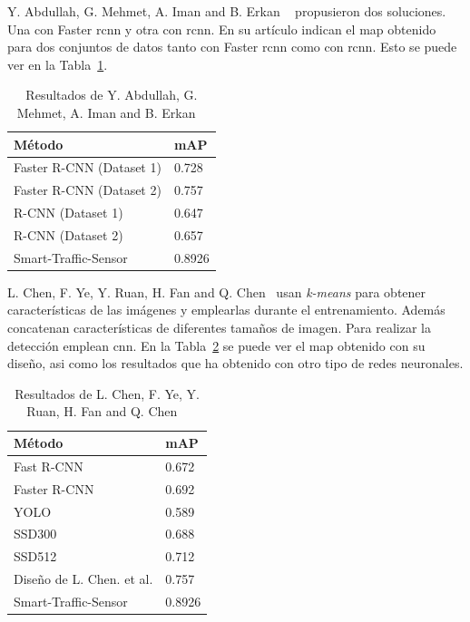 Y. Abdullah, G. Mehmet, A. Iman and B. Erkan ~\cite{rcnn_detection} propusieron dos soluciones. Una con Faster \acrshort{rcnn} y otra con \acrshort{rcnn}. En su artículo indican el \acrshort{map} obtenido para dos conjuntos de datos tanto con Faster \acrshort{rcnn} como con \acrshort{rcnn}. Esto se puede ver en la Tabla~\ref{resultados_abdullah}.

\begin{table}[H] 
\begin{center}
\begin{tabular}{|l|l|}
\hline
Método & mAP  \\ 
\hline \hline
Faster R-CNN (Dataset 1) & 0.728  \\ \hline
Faster R-CNN (Dataset 2)  & 0.757 \\ \hline
R-CNN (Dataset 1) & 0.647  \\ \hline
R-CNN (Dataset 2)  & 0.657 \\ \hline
Smart-Traffic-Sensor & 0.8926 \\  \hline
\end{tabular}
\caption{Resultados de Y. Abdullah, G. Mehmet, A. Iman and B. Erkan ~\cite{rcnn_detection}}
\label{resultados_abdullah}
\end{center}
\end{table}

L. Chen, F. Ye, Y. Ruan, H. Fan and Q. Chen~\cite{l_chen} usan \textit{k-means} para obtener características de las imágenes y emplearlas durante el entrenamiento. Además concatenan características de diferentes tamaños de imagen. Para realizar la detección emplean \acrshort{cnn}. En la Tabla~\ref{resultados_lchen} se puede ver el \acrshort{map} obtenido con su diseño, asi como los resultados que ha obtenido con otro tipo de redes neuronales.

\begin{table}[H] 
\begin{center}
\begin{tabular}{|l|l|}
\hline
Método & mAP  \\ 
\hline \hline
Fast R-CNN & 0.672  \\ \hline
Faster R-CNN & 0.692 \\ \hline
YOLO & 0.589  \\ \hline
SSD300  & 0.688 \\ \hline
SSD512  & 0.712 \\ \hline
Diseño de L. Chen. et al. & 0.757 \\ \hline
Smart-Traffic-Sensor & 0.8926 \\  \hline
\end{tabular}
\caption{Resultados de L. Chen, F. Ye, Y. Ruan, H. Fan and Q. Chen ~\cite{l_chen}}
\label{resultados_lchen}
\end{center}
\end{table}

